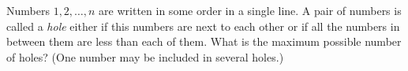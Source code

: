 \problem
\label{2014/en/team/junior/3:problem}%
Numbers $1, 2, \ldots, n$ are written in some order in a single line.
A pair of numbers is called a \emph{hole} either if this numbers are next to
each other or if all the numbers in between them are less than each of them.
What is the maximum possible number of holes?
(One number may be included in several holes.)
\solution
\endproblem
